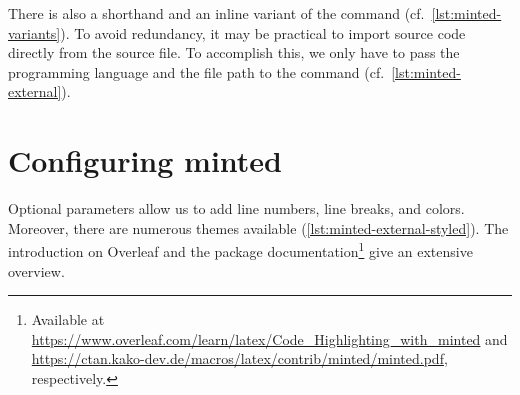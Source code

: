 

\noindent There is also a shorthand and an inline variant of the command (cf.\ \cref{lst:minted-variants}).
To avoid redundancy, it may be practical to import source code directly from the source file.
To accomplish this, we only have to pass the programming language and the file path to the  command (cf.\ \cref{lst:minted-external}).


\section{Configuring minted}
Optional parameters allow us to add line numbers, line breaks, and colors.
Moreover, there are numerous themes available (\cref{lst:minted-external-styled}).
The introduction on Overleaf and the package documentation\footnote{Available at \url{https://www.overleaf.com/learn/latex/Code_Highlighting_with_minted} and \url{https://ctan.kako-dev.de/macros/latex/contrib/minted/minted.pdf}, respectively.} give an extensive overview.

